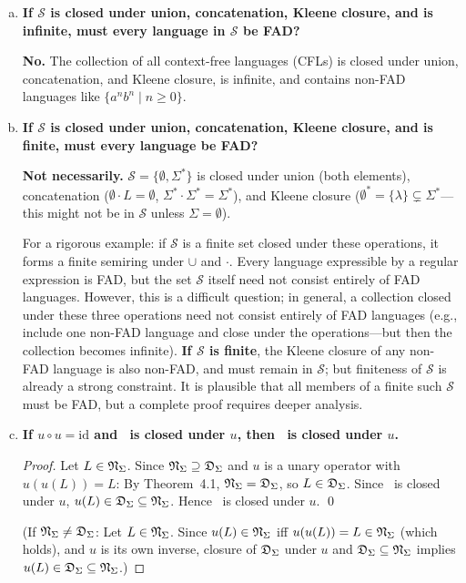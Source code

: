 \begin{enumerate}[{5.}1. ]
\begin{enumerate}[(a)]
\item \textbf{If $\mathcal{S}$ is closed under union, concatenation, Kleene closure, and is infinite, must every language in $\mathcal{S}$ be FAD?}

\textbf{No.}  The collection of all context-free languages (CFLs) is closed under union, concatenation, and Kleene closure, is infinite, and contains non-FAD languages like $\{a^nb^n\mid n\ge 0\}$.

\item \textbf{If $\mathcal{S}$ is closed under union, concatenation, Kleene closure, and is finite, must every language be FAD?}

\textbf{Not necessarily.}  $\mathcal{S}=\{\emptyset,\Sigma^*\}$ is closed under union (both elements), concatenation ($\emptyset\cdot L=\emptyset$, $\Sigma^*\cdot\Sigma^*=\Sigma^*$), and Kleene closure ($\emptyset^*=\{\lambda\}\subsetneq\Sigma^*$---this might not be in $\mathcal{S}$ unless $\Sigma=\emptyset$).

For a rigorous example: if $\mathcal{S}$ is a finite set closed under these operations, it forms a finite semiring under $\cup$ and $\cdot$.  Every language expressible by a regular expression is FAD, but the set $\mathcal{S}$ itself need not consist entirely of FAD languages.  However, this is a difficult question; in general, a collection closed under these three operations need not consist entirely of FAD languages (e.g., include one non-FAD language and close under the operations---but then the collection becomes infinite).  \textbf{If $\mathcal{S}$ is finite}, the Kleene closure of any non-FAD language is also non-FAD, and must remain in $\mathcal{S}$; but finiteness of $\mathcal{S}$ is already a strong constraint.  It is plausible that all members of a finite such $\mathcal{S}$ must be FAD, but a complete proof requires deeper analysis.

\item \textbf{If $u\circ u=\text{id}$ and \DSIG\ is closed under $u$, then \NSIG\ is closed under $u$.}

\begin{proof}
Let $L\in\mathfrak{N}_\Sigma$.  Since $\mathfrak{N}_\Sigma\supseteq\mathfrak{D}_\Sigma$ and $u$ is a unary operator with $u(u(L))=L$:
By Theorem~4.1, $\mathfrak{N}_\Sigma=\mathfrak{D}_\Sigma$, so $L\in\mathfrak{D}_\Sigma$.  Since \DSIG\ is closed under $u$, $u(L)\in\mathfrak{D}_\Sigma\subseteq\mathfrak{N}_\Sigma$.  Hence \NSIG\ is closed under $u$.  \qed

(If $\mathfrak{N}_\Sigma\neq\mathfrak{D}_\Sigma$: Let $L\in\mathfrak{N}_\Sigma$.  Since $u(L)\in\mathfrak{N}_\Sigma$ iff $u(u(L))=L\in\mathfrak{N}_\Sigma$ (which holds), and $u$ is its own inverse, closure of $\mathfrak{D}_\Sigma$ under $u$ and $\mathfrak{D}_\Sigma\subseteq\mathfrak{N}_\Sigma$ implies $u(L)\in\mathfrak{D}_\Sigma\subseteq\mathfrak{N}_\Sigma$.)
\end{proof}

\end{enumerate}

\end{enumerate}
